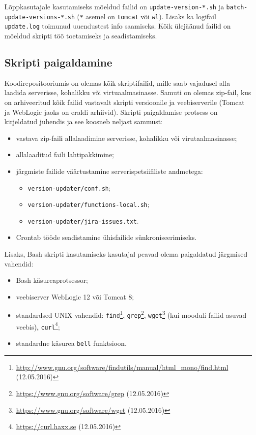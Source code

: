 \documentclass[12pt]{article}
\newcommand{\code}[1]{\texttt{#1}}
\begin{document}
   Lõppkasutajale kasutamiseks mõeldud failid on \code{update-version-*.sh} ja \code{batch-} \code{update-versions-*.sh} (\code{*} asemel on \code{tomcat} või \code{wl}). Lisaks ka logifail \code{update.log} toimunud uuendustest info saamiseks. Kõik ülejäänud failid on mõeldud skripti töö toetamiseks ja seadistamiseks.
   
   \newpage
      
 \subsection{Skripti paigaldamine}
  
  Koodirepositooriumis on olemas kõik skriptifailid, mille saab vajadusel alla laadida serverisse, kohalikku või virtuaalmasinasse. Samuti on olemas zip\--fail, kus on arhiveeritud kõik failid vastavalt skripti versioonile ja veebiserverile (Tomcat ja WebLogic jaoks on eraldi arhiivid). Skripti paigaldamise protsess on kirjeldatud juhendis ja see koosneb neljast sammust:
  \begin{itemize}
    \item vastava zip\--faili allalaadimine serverisse, kohalikku või virutaalmasinasse;
    \item allalaaditud faili lahtipakkimine;
    \item järgmiste failide väärtustamine serverispetsiifiliste andmetega:
    \begin{itemize}
      \item \code{version-updater/conf.sh};
      \item \code{version-updater/functions-local.sh};
      \item \code{version-updater/jira-issues.txt}.
    \end{itemize}
    \item Crontab tööde seadistamine ühisfailide sünkroniseerimiseks.
  \end{itemize}
  
  Lisaks, Bash skripti kasutamiseks kasutajal peavad olema paigaldatud järgmised vahendid:
  \begin{itemize}
    \item Bash käsureaprotsessor;
    \item veebiserver WebLogic 12 või Tomcat 8;
    \item standardsed UNIX vahendid: \code{find}\footnote{\url{http://www.gnu.org/software/findutils/manual/html_mono/find.html} (12.05.2016)}, \code{grep}\footnote{\url{https://www.gnu.org/software/grep} (12.05.2016)}, \code{wget}\footnote{\url{https://www.gnu.org/software/wget} (12.05.2016)} (kui mooduli failid asuvad veebis), \code{curl}\footnote{\url{https://curl.haxx.se} (12.05.2016)};
    \item standardne käsurea \code{bell} funktsioon.
  \end{itemize}
\end{document}
